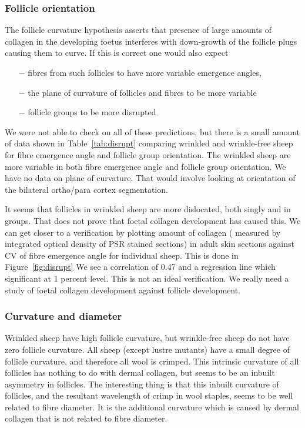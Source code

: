 \documentclass{article}
\begin{document}
\subsubsection{Follicle orientation}
The follicle curvature hypothesis asserts that presence of large amounts of collagen in the developing foetus interferes with down-growth of the follicle plugs causing them to curve. If this is correct one would also expect 
\small
\begin{itemize}
\item[$-$] fibres from such follicles to have more variable emergence angles, 
\item[$-$] the plane of curvature of follicles and fibres to be more variable
\item[$-$] follicle groups to be more disrupted
\end{itemize}
\normalsize
We were not able to check on all of these predictions, but there is a small amount of data shown in Table~\ref{tab:disrupt} comparing wrinkled and wrinkle-free sheep for fibre emergence angle and follicle group orientation.
%
The wrinkled sheep are more variable in both fibre emergence angle and follicle group orientation. We have no data on plane of curvature. That would involve looking at orientation of the bilateral ortho/para cortex segmentation.

It seems that follicles in wrinkled sheep are more dislocated, both singly and in groups. That does not prove that foetal collagen development  has caused this.  We can get closer to a verification by plotting amount of collagen ( measured by integrated optical density of PSR stained sections) in adult skin sections against CV of fibre emergence angle for individual sheep. This is done in Figure~\ref{fig:disrupt}
%
We see a correlation of 0.47  and a regression line which significant at 1 percent level.  This is not an ideal verification. We really need a study of foetal collagen development against follicle development.

\subsubsection{Curvature and diameter}
Wrinkled sheep have high follicle curvature, but wrinkle-free sheep do not have zero follicle curvature. All sheep (except lustre mutants) have a small degree of follicle curvature, and therefore all wool is crimped. This intrinsic curvature of all follicles has nothing to do with dermal collagen, but seems to be an inbuilt asymmetry in follicles. The interesting thing is that this inbuilt curvature of follicles, and the resultant wavelength of crimp in wool staples, seems to be well related to fibre diameter.  It is the additional curvature which is caused by dermal collagen that is not related to fibre diameter. 
\end{document}
